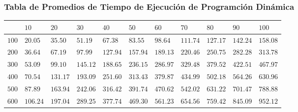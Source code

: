 \documentclass[12pt]{article}
\begin{document}
\subsubsection*{Tabla de Promedios de Tiempo de Ejecuci\'on de Programci\'on Din\'amica}
\begin{tabu}{|@{}*{11}{p{1.4cm}@{}|}}
%
& $10$ & $20$ & $30$ & $40$ & $50$ & $60$ & $70$ & $80$ & $90$ & $100$ \\\hline
$100$ & $20.05$ & $35.50$ & $51.19$ & $67.38$ & $83.55$ & $98.64$ & $111.74$ & $127.17$ & $142.24$ & $158.08$ \\\hline
$200$ & $36.64$ & $67.19$ & $97.99$ & $127.94$ & $157.94$ & $189.13$ & $220.46$ & $250.75$ & $282.28$ & $313.78$ \\\hline
$300$ & $53.09$ & $99.10$ & $145.12$ & $188.65$ & $236.15$ & $286.97$ & $329.48$ & $379.52$ & $422.51$ & $467.97$ \\\hline
$400$ & $70.54$ & $131.17$ & $193.09$ & $251.60$ & $313.43$ & $379.87$ & $434.99$ & $502.18$ & $564.26$ & $630.96$ \\\hline
$500$ & $87.89$ & $163.94$ & $242.06$ & $316.42$ & $391.74$ & $470.62$ & $542.02$ & $631.22$ & $701.47$ & $788.88$ \\\hline
$600$ & $106.24$ & $197.04$ & $289.25$ & $377.74$ & $469.30$ & $561.23$ & $654.56$ & $759.42$ & $845.09$ & $952.12$ \\\hline

\end{tabu}
\end{document}
